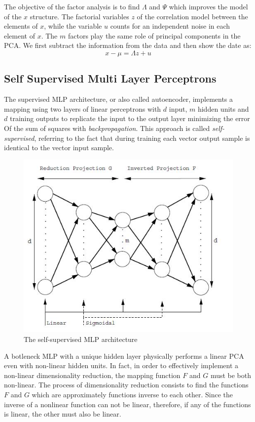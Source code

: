 \documentclass{article}
\begin{document}
The objective of the factor analysis is to find $\Lambda$ and $\Psi$ which improves the model of the $ x $ structure. The factorial variables $ z $ of the correlation model between the elements of $ x $, while the variable $ u $ counts for an independent noise in each element of $ x $. The $ m$ factors play the same role of principal components in the PCA. We first subtract the information from the data and then show the date as:
\begin{equation}
    x - \mu = \Lambda z + u
\end{equation}

\subsection{Self Supervised Multi Layer Perceptrons}
The supervised MLP architecture, or also called autoencoder, implements a mapping using two layers of linear perceptrons with $ d $ input, $ m $ hidden units and $ d $ training outputs to replicate the input to the output layer minimizing the error Of the sum of squares with \textit{backpropagation}. This approach is called \textit{self-supervised}, referring to the fact that during training each vector output sample is identical to the vector input sample.
\begin{figure}[htp]\centering
\includegraphics[width=0.6\columnwidth]{images_fractal/frac_2.JPG}
\caption{ The self-supervised MLP architecture }
\label{fig:fig_2}
\end{figure}

A botleneck MLP with a unique hidden layer physically performs a linear PCA even with non-linear hidden units. In fact, in order to effectively implement a non-linear dimensionality reduction, the mapping function $ F $ and $ G $ must be both non-linear. The process of dimensionality reduction consists to find the functions $ F $ and $ G $ which are approximately functions inverse to each other. Since the inverse of a nonlinear function can not be linear, therefore, if any of the functions is linear, the other must also be linear.
\end{document}

